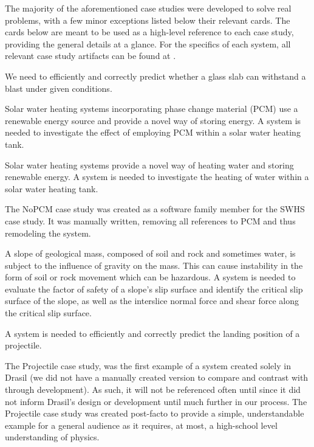 The majority of the aforementioned case studies were developed to solve real
problems, with a few minor exceptions listed below their relevant cards.
The cards below are meant to be used as a high-level reference to each case 
study, providing the general details at a glance. For the specifics of each 
system, all relevant case study artifacts can be found at .

{We need to efficiently and correctly predict whether a glass 
slab can withstand a blast under given conditions.}
{}

{Solar water heating systems incorporating phase change 
 material (PCM) use a renewable energy source and provide a novel way of 
 storing energy. A system is needed to investigate the effect of employing PCM
 within a solar water heating tank.}
{}

{Solar water heating systems provide a novel way of 
heating water and storing renewable energy. A system is needed to investigate
the heating of water within a solar water heating tank.}
{}

The NoPCM case study was created as a software family member for the SWHS case
study. It was manually written, removing all references to PCM and thus 
remodeling the system.

{A slope of geological mass, composed of soil and rock 
 and sometimes water, is subject to the influence of gravity on the mass. 
 This can cause instability in the form of soil or rock movement which can
 be hazardous. A system is needed to evaluate the factor of safety of 
 a slope's slip surface and identify the critical slip surface of the slope, 
 as well as the interslice normal force and shear force along the critical 
 slip surface.}
{}

{A system is needed to efficiently and correctly predict
 the landing position of a projectile.}
{}

The Projectile case study, was the first example of a system 
created solely in Drasil (we did not have a manually created version to compare 
and contrast with through development). As such, it will not be referenced 
often until  since it did not inform Drasil's design or 
development until much further in our process. The Projectile case study was 
created post-facto to provide a simple, understandable example for a general 
audience as it requires, at most, a high-school level understanding of physics. 

